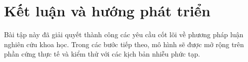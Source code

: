 \section{Kết luận và hướng phát triển}
\label{sec:ket_luan}

Bài tập này đã giải quyết thành công các yêu cầu cốt lõi về phương pháp luận nghiên cứu khoa học. Trong các bước tiếp theo, mô hình sẽ được mở rộng trên phần cứng thực tế và kiểm thử với các kịch bản nhiễu phức tạp.
